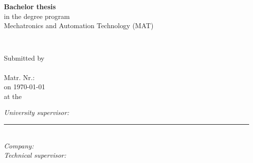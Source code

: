 \begin{titlepage}

    \thispagestyle{fancy}
    \fancyhf{}
    \renewcommand{\headrulewidth}{0pt}
    \renewcommand{\footrulewidth}{0pt}
    
    
    
    \setlength{\headheight}{55pt}

    
  
    \center
	\Huge
	\vspace*{0.5cm}
	\textbf{Bachelor thesis}\\[0.5cm]
	\large
	in the degree program\\
	
	Mechatronics and Automation Technology (MAT)\\
	\vfill
	
	

        \begin{spacing}{2}
            {\Huge\textbf{\myThesis{}}}\\
        \end{spacing}
    \vfill
	
	
	
	
	Submitted by\\[0.5cm]
	
    \textbf{\myName{}}\\
	Matr. Nr.: \myStudentID{} \\[0.5cm]
	

    on \today \\
    at the \myHochschule{} \\

    \vfill
    
    \begin{flushleft}
        \textit{University supervisor:} \myUniversitySupervisor{}\\
        \rule{\linewidth}{0.5mm}\\
        \textit{Company:} \myCompany{}\\
        \textit{Technical supervisor:} \myTechnicalSupervisor{}
    \end{flushleft}


    \vfill

\end{titlepage}